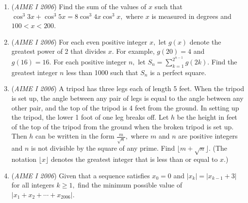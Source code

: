 \begin{enumerate}
 

	\item (\textit{AIME I 2006}) Find the sum of the values of $x$ such that $\cos^3 3x+ \cos^3 5x = 8 \cos^3 4x \cos^3 x,$ where $x$ is measured in degrees and $100< x< 200.$


	\item (\textit{AIME I 2006}) For each even positive integer $x,$ let $g(x)$ denote the greatest power of 2 that divides $x.$ For example, $g(20)=4$ and $g(16)=16.$ For each positive integer $n,$ let $S_n=\sum_{k=1}^{2^{n-1}}g(2k).$ Find the greatest integer $n$ less than 1000 such that $S_n$ is a perfect square.


 

	\item (\textit{AIME I 2006}) A tripod has three legs each of length 5 feet. When the tripod is set up, the angle between any pair of legs is equal to the angle between any other pair, and the top of the tripod is 4 feet from the ground. In setting up the tripod, the lower 1 foot of one leg breaks off. Let $h$ be the height in feet of the top of the tripod from the ground when the broken tripod is set up. Then $h$ can be written in the form $\frac m{\sqrt{n}},$ where $m$ and $n$ are positive integers and $n$ is not divisible by the square of any prime. Find $\lfloor m+\sqrt{n}\rfloor.$ (The notation $\lfloor x\rfloor$ denotes the greatest integer that is less than or equal to $x.$)


 

	\item (\textit{AIME I 2006}) Given that a sequence satisfies $x_0=0$ and $|x_k|=|x_{k-1}+3|$ for all integers $k\ge 1,$ find the minimum possible value of $|x_1+x_2+\cdots+x_{2006}|.$


\end{enumerate}
